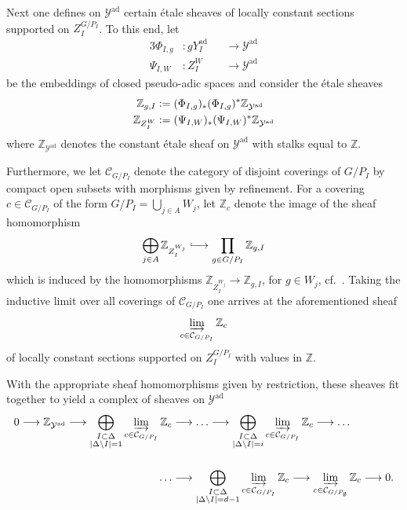 \documentclass[a4paper, reqno, 10pt]{amsart}
\theoremstyle{definition}
\numberwithin{equation}{section}
\newcommand{\abs}[1]{{\lvert{#1}\rvert}}
\newcommand{\ad}{{\mathrm{ad}}}
\newcommand{\defeq}{\vcentcolon=}
\newcommand{\lra}{\longrightarrow}
\newcommand{\ra}{\rightarrow}
\newcommand{\BZ}{{\mathbb {Z}}}
\newcommand{\CC}{{\mathcal {C}}}
\newcommand{\CY}{{\mathcal {Y}}}
\begin{document}
Next one defines on $\CY^\ad$ certain \'etale sheaves of locally constant sections supported on $Z_I^{G/P_I}$.
To this end, let
\begin{alignat*}{3}
	\Phi_{I,g} &\colon g Y_I^\ad &&\lra \CY^\ad \\
	\Psi_{I,W} &\colon Z_I^W &&\lra \CY^\ad
\end{alignat*}
be the embeddings of closed pseudo-adic spaces and consider the \'etale sheaves
\begin{alignat*}{3}
	\BZ_{g,I} &\defeq (\Phi_{I,g})_\ast (\Phi_{I,g})^\ast \BZ_{\CY^\ad} \\
	\BZ_{Z^W_I} &\defeq (\Psi_{I,W})_\ast (\Psi_{I,W})^\ast \BZ_{\CY^\ad}
\end{alignat*}
where $\BZ_{\CY^\ad}$ denotes the constant \'etale sheaf on $\CY^\ad$ with stalks equal to $\BZ$.


Furthermore, we let $\CC_{G/P_I}$ denote the category of disjoint coverings of $G/P_I$ by compact open subsets with morphisms given by refinement.
For a covering $c\in \CC_{G/P_I}$ of the form $G/P_I = \bigcup_{j\in A} W_j$, let $\BZ_c$ denote the image of the sheaf homomorphism
\begin{equation*}
	\bigoplus\limits_{j\in A} \BZ_{Z^{W_j}_I} \lhook\joinrel\longrightarrow \prod\limits_{g \in G/P_I} \BZ_{g,I}
\end{equation*}
which is induced by the homomorphisms $\BZ_{Z_I^{W_j}} \ra \BZ_{g,I}$, for $g \in W_j$, cf.\ \cite[p.\ 621]{Orlik08EquivVBDrinfeldUpHalfSp}.
Taking the inductive limit over all coverings of $\CC_{G/P_I}$ one arrives at the aforementioned sheaf
\begin{equation*}
	\varinjlim_{c \in \CC_{G/P_I}} \BZ_c
\end{equation*}
of locally constant sections supported on $Z_{I}^{G/P_I}$ with values in $\BZ$.


With the appropriate sheaf homomorphisms given by restriction, these sheaves fit together to yield a complex of sheaves on $\CY^\ad$
\begin{equation}\label{Eq 3 - Fundamental complex}
	\begin{aligned}
		0 \lra \BZ_{\CY^\ad} \lra \bigoplus_{\substack{I\subset \Delta \\ \abs{\Delta\setminus I}=1 }} \varinjlim_{c\in \CC_{G/P_I}} \BZ_c &\lra \ldots \lra \bigoplus_{\substack{I\subset \Delta \\ \abs{\Delta\setminus I}=i}} \varinjlim_{c\in \CC_{G/P_I}} \BZ_c \lra \ldots \\[0.5cm]
		\ldots &\lra \bigoplus_{\substack{I\subset \Delta \\ \abs{\Delta\setminus I}=d-1}} \varinjlim_{c\in \CC_{G/P_I}} \BZ_c \lra \varinjlim_{c\in \CC_{G/P_\emptyset}} \BZ_c \lra 0 .	
	\end{aligned}	
\end{equation}
\end{document}
